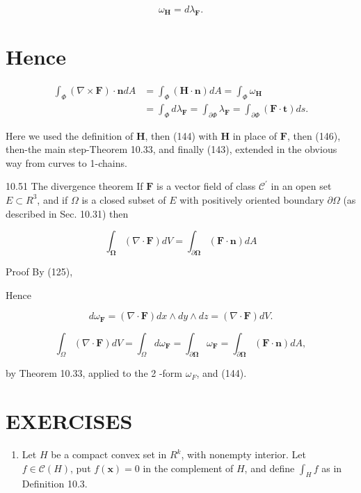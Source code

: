 \documentclass[10pt]{article}
\begin{document}
$$
\omega_{\mathbf{H}}=d \lambda_{\mathbf{F}} .
$$

\section{Hence}
$$
\begin{aligned}
\int_{\Phi}(\nabla \times \mathbf{F}) \cdot \mathbf{n} d A & =\int_{\Phi}(\mathbf{H} \cdot \mathbf{n}) d A=\int_{\Phi} \omega_{\mathbf{H}} \\
& =\int_{\Phi} d \lambda_{\mathbf{F}}=\int_{\partial \Phi} \lambda_{\mathbf{F}}=\int_{\partial \Phi}(\mathbf{F} \cdot \mathbf{t}) d s .
\end{aligned}
$$

Here we used the definition of $\mathbf{H}$, then (144) with $\mathbf{H}$ in place of $\mathbf{F}$, then (146), then-the main step-Theorem 10.33, and finally (143), extended in the obvious way from curves to 1-chains.

10.51 The divergence theorem If $\mathbf{F}$ is a vector field of class $\mathscr{C}^{\prime}$ in an open set $E \subset R^{3}$, and if $\Omega$ is a closed subset of $E$ with positively oriented boundary $\partial \Omega$ (as described in Sec. 10.31) then

$$
\int_{\mathbf{\Omega}}(\nabla \cdot \mathbf{F}) d V=\int_{\partial \boldsymbol{\Omega}}(\mathbf{F} \cdot \mathbf{n}) d A
$$

Proof By (125),

Hence

$$
d \omega_{\mathbf{F}}=(\nabla \cdot \mathbf{F}) d x \wedge d y \wedge d z=(\nabla \cdot \mathbf{F}) d V .
$$

$$
\int_{\Omega}(\nabla \cdot \mathbf{F}) d V=\int_{\Omega} d \omega_{\mathbf{F}}=\int_{\partial \boldsymbol{\Omega}} \omega_{\mathbf{F}}=\int_{\partial \boldsymbol{\Omega}}(\mathbf{F} \cdot \mathbf{n}) d A,
$$

by Theorem 10.33, applied to the 2 -form $\omega_{F}$, and (144).

\section{EXERCISES}
\begin{enumerate}
  \item Let $H$ be a compact convex set in $R^{k}$, with nonempty interior. Let $f \in \mathscr{C}(H)$, put $f(\mathbf{x})=0$ in the complement of $H$, and define $\int_{H} f$ as in Definition 10.3.
\end{enumerate}
\end{document}
